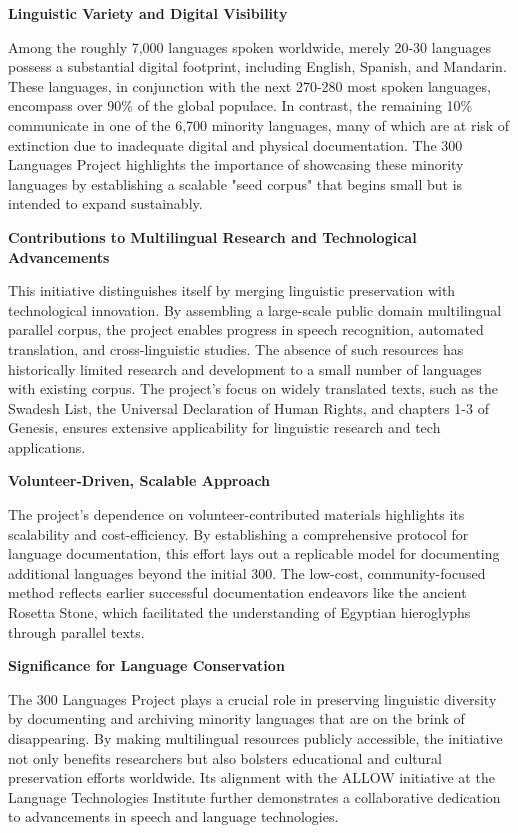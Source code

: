 \textbf{Linguistic Variety and Digital Visibility}

Among the roughly 7,000 languages spoken worldwide, merely 20-30 languages possess a substantial digital footprint, including English, Spanish, and Mandarin. These languages, in conjunction with the next 270-280 most spoken languages, encompass over 90\% of the global populace. In contrast, the remaining 10\% communicate in one of the 6,700 minority languages, many of which are at risk of extinction due to inadequate digital and physical documentation. The 300 Languages Project highlights the importance of showcasing these minority languages by establishing a scalable "seed corpus" that begins small but is intended to expand sustainably.

\textbf{Contributions to Multilingual Research and Technological Advancements}

This initiative distinguishes itself by merging linguistic preservation with technological innovation. By assembling a large-scale public domain multilingual parallel corpus, the project enables progress in speech recognition, automated translation, and cross-linguistic studies. The absence of such resources has historically limited research and development to a small number of languages with existing corpus. The project’s focus on widely translated texts, such as the Swadesh List, the Universal Declaration of Human Rights, and chapters 1-3 of Genesis, ensures extensive applicability for linguistic research and tech applications.

\textbf{Volunteer-Driven, Scalable Approach}

The project's dependence on volunteer-contributed materials highlights its scalability and cost-efficiency. By establishing a comprehensive protocol for language documentation, this effort lays out a replicable model for documenting additional languages beyond the initial 300. The low-cost, community-focused method reflects earlier successful documentation endeavors like the ancient Rosetta Stone, which facilitated the understanding of Egyptian hieroglyphs through parallel texts.

\textbf{Significance for Language Conservation}

The 300 Languages Project plays a crucial role in preserving linguistic diversity by documenting and archiving minority languages that are on the brink of disappearing. By making multilingual resources publicly accessible, the initiative not only benefits researchers but also bolsters educational and cultural preservation efforts worldwide. Its alignment with the ALLOW initiative at the Language Technologies Institute further demonstrates a collaborative dedication to advancements in speech and language technologies.

\begin{comment}
\section{Chapter Summary}
Should include a table of related studies comparing them based on several criteria.

Highlight research gaps and the research problem.
\end{comment}












